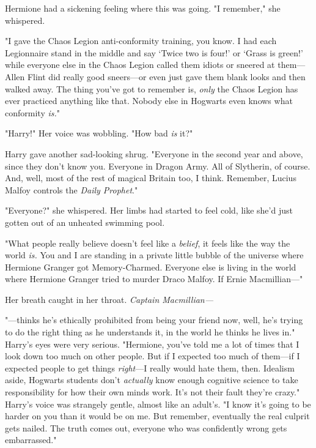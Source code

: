 Hermione had a sickening feeling where this was going. "I remember," she 
whispered.

"I gave the Chaos Legion anti-conformity training, you know. I had each 
Legionnaire stand in the middle and say `Twice two is four!' or `Grass is 
green!' while everyone else in the Chaos Legion called them idiots or sneered 
at them---Allen Flint did really good sneers---or even just gave them blank 
looks and then walked away. The thing you've got to remember is, \emph{only} 
the Chaos Legion has ever practiced anything like that. Nobody else in Hogwarts 
even knows what conformity \emph{is.}"

"Harry!" Her voice was wobbling. "How bad \emph{is} it?"

Harry gave another sad-looking shrug. "Everyone in the second year and above, 
since they don't know you. Everyone in Dragon Army. All of Slytherin, of 
course. And, well, most of the rest of magical Britain too, I think. Remember, 
Lucius Malfoy controls the \emph{Daily Prophet}."

"Everyone?" she whispered. Her limbs had started to feel cold, like she'd just 
gotten out of an unheated swimming pool.

"What people really believe doesn't feel like a \emph{belief}, it feels like 
the way the world \emph{is.} You and I are standing in a private little bubble 
of the universe where Hermione Granger got Memory-Charmed. Everyone else is 
living in the world where Hermione Granger tried to murder Draco Malfoy. If 
Ernie Macmillian---"

Her breath caught in her throat. \emph{Captain Macmillian---}

"---thinks he's ethically prohibited from being your friend now, well, he's 
trying to do the right thing as he understands it, in the world he thinks he 
lives in." Harry's eyes were very serious. "Hermione, you've told me a lot of 
times that I look down too much on other people. But if I expected too much of 
them---if I expected people to get things \emph{right}---I really would hate 
them, then. Idealism aside, Hogwarts students don't \emph{actually} know enough 
cognitive science to take responsibility for how their own minds work. It's not 
their fault they're crazy." Harry's voice was strangely gentle, almost like an 
adult's. "I know it's going to be harder on you than it would be on me. But 
remember, eventually the real culprit gets nailed. The truth comes out, 
everyone who was confidently wrong gets embarrassed."

